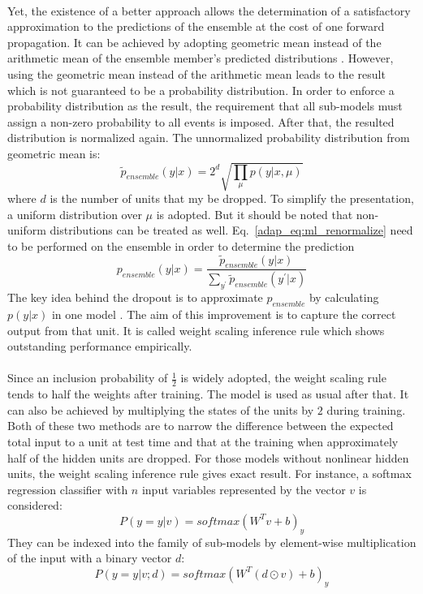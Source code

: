 \paragraph{}
Yet, the existence of a better approach allows the determination of a satisfactory approximation to the predictions of the ensemble at the cost of one forward propagation.
It can be achieved by adopting geometric mean instead of the arithmetic mean of the ensemble member's predicted distributions \cite{WardeFarley2014SelfinformedNN}.
However, using the geometric mean instead of the arithmetic mean leads to the result which is not guaranteed to be a probability distribution.
In order to enforce a probability distribution as the result, the requirement that all sub-models must assign a non-zero probability to all events is imposed.
After that, the resulted distribution is normalized again.
The unnormalized probability distribution from geometric mean is:
\begin{equation}
    \tilde{p}_{ensemble}(y|x) = 2^d \sqrt{\prod_\mu p(y|x,\mu)}
\end{equation}
%
where $d$ is the number of units that my be dropped.
To simplify the presentation, a uniform distribution over $\mu$ is adopted.
But it should be noted that non-uniform distributions can be treated as well.
Eq.~\ref{adap_eq:ml_renormalize} need to be performed on the ensemble in order to determine the prediction
\begin{equation}
    p_{ensemble}(y|x) = \frac{
        \tilde{p}_{ensemble}(y|x)
    }{
        \sum_{y^\prime} \tilde{p}_{ensemble}(y^\prime|x)
    }
    \label{adap_eq:ml_renormalize}
\end{equation}
%
The key idea behind the dropout is to approximate $p_{ensemble}$ by calculating $p(y|x)$ in one model \cite{hinton2012}.
The aim of this improvement is to capture the correct output from that unit.
It is called weight scaling inference rule which shows outstanding performance empirically.
\paragraph{}
Since an inclusion probability of $\frac{1}{2}$ is widely adopted, the weight scaling rule tends to half the weights after training.
The model is used as usual after that.
It can also be achieved by multiplying the states of the units by $2$ during training.
Both of these two methods are to narrow the difference between the expected total input to a unit at test time and that at the training when approximately half of the hidden units are dropped.
For those models without nonlinear hidden units, the weight scaling inference rule gives exact result.
For instance, a softmax regression classifier with $n$ input variables represented by the vector $v$ is considered:
\begin{equation}
    P(y=y|v)=softmax(W^Tv+b)_y
\end{equation}
%
They can be indexed into the family of sub-models by element-wise multiplication of the input with a binary vector $d$:
\begin{equation}
    P(y=y|v;d) = softmax(W^T(d \odot v)+b)_y
\end{equation}


